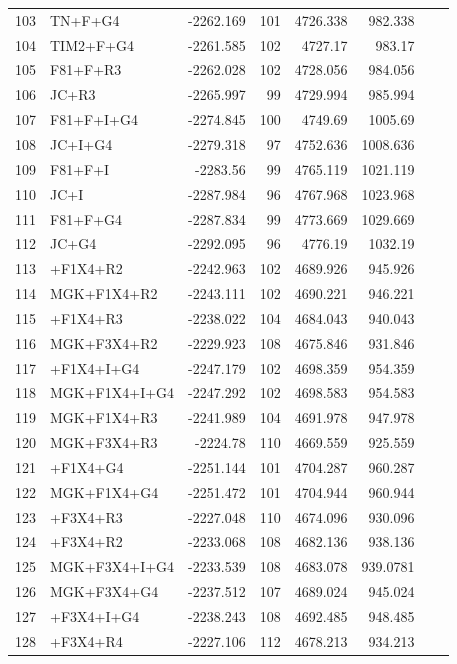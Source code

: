 \documentclass[12pt]{article}
\begin{document}
\begin{longtable}{clrrrrrr}
	103 & TN+F+G4 & -2262.169 & 101 & 4726.338 & 982.338 \\ 
	104 & TIM2+F+G4 & -2261.585 & 102 & 4727.17 & 983.17 \\ 
	105 & F81+F+R3 & -2262.028 & 102 & 4728.056 & 984.056 \\ 
	106 & JC+R3 & -2265.997 & 99 & 4729.994 & 985.994 \\ 
	107 & F81+F+I+G4 & -2274.845 & 100 & 4749.69 & 1005.69 \\ 
	108 & JC+I+G4 & -2279.318 & 97 & 4752.636 & 1008.636 \\ 
	109 & F81+F+I & -2283.56 & 99 & 4765.119 & 1021.119 \\ 
	110 & JC+I & -2287.984 & 96 & 4767.968 & 1023.968 \\ 
	111 & F81+F+G4 & -2287.834 & 99 & 4773.669 & 1029.669 \\ 
	112 & JC+G4 & -2292.095 & 96 & 4776.19 & 1032.19 \\ 
	113 & \gy+F1X4+R2 & -2242.963 & 102 & 4689.926 & 945.926 \\ 
	114 & MGK+F1X4+R2 & -2243.111 & 102 & 4690.221 & 946.221 \\ 
	115 & \gy+F1X4+R3 & -2238.022 & 104 & 4684.043 & 940.043 \\ 
	116 & MGK+F3X4+R2 & -2229.923 & 108 & 4675.846 & 931.846 \\ 
	117 & \gy+F1X4+I+G4 & -2247.179 & 102 & 4698.359 & 954.359 \\ 
	118 & MGK+F1X4+I+G4 & -2247.292 & 102 & 4698.583 & 954.583 \\ 
	119 & MGK+F1X4+R3 & -2241.989 & 104 & 4691.978 & 947.978 \\ 
	120 & MGK+F3X4+R3 & -2224.78 & 110 & 4669.559 & 925.559 \\ 
	121 & \gy+F1X4+G4 & -2251.144 & 101 & 4704.287 & 960.287 \\ 
	122 & MGK+F1X4+G4 & -2251.472 & 101 & 4704.944 & 960.944 \\ 
	123 & \gy+F3X4+R3 & -2227.048 & 110 & 4674.096 & 930.096 \\ 
	124 & \gy+F3X4+R2 & -2233.068 & 108 & 4682.136 & 938.136 \\ 
	125 & MGK+F3X4+I+G4 & -2233.539 & 108 & 4683.078 & 939.0781 \\ 
	126 & MGK+F3X4+G4 & -2237.512 & 107 & 4689.024 & 945.024 \\ 
	127 & \gy+F3X4+I+G4 & -2238.243 & 108 & 4692.485 & 948.485 \\ 
	128 & \gy+F3X4+R4 & -2227.106 & 112 & 4678.213 & 934.213 \\ 

\end{longtable}
\end{document}
